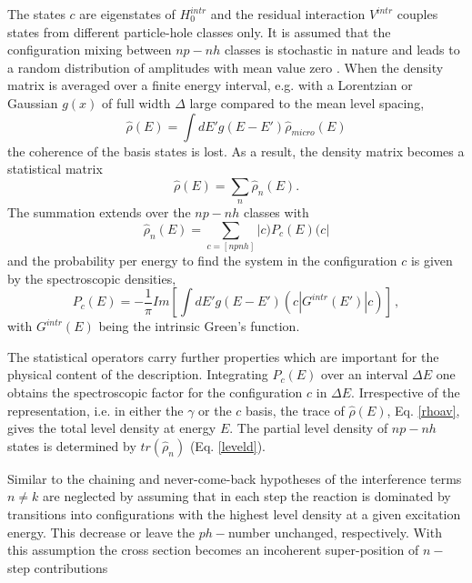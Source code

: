 \documentclass[twocolumn,amsmath,amssymb,10pt,groupedaddress,a4paper]{revtex4}
\begin{document}
\noindent The states $c$ are eigenstates of $H_{0}^{intr}$ and the residual
interaction $V^{intr}$ couples states from different particle-hole
classes only. It is assumed that the configuration mixing between
$np-nh$ classes is stochastic in nature and leads to a random distribution
of amplitudes with mean value zero \cite{LW92}. When the density
matrix is averaged over a finite energy interval, e.g. with a Lorentzian
or Gaussian $g(x)$ of full width $\Delta$ large compared to the
mean level spacing,
\begin{equation}
\hat{\rho}(E)=\int dE'g(E-E')\hat{\rho}_{micro}(E)\label{rhoav}
\end{equation}
\noindent the coherence of the basis states is lost. As a result, the density
matrix becomes a statistical matrix
\begin{equation}
\hat{\rho}(E)=\sum_{n}{\hat{\rho}_{n}(E)}.\label{levelc}
\end{equation}
\noindent The summation extends over the $np-nh$ classes with
\begin{equation}
\hat{\rho}_{n}(E)=\sum_{c=[npnh]}{|c)P_{c}(E)(c|}\label{leveld}
\end{equation}
\noindent and the probability per energy to find the system in the configuration
$c$ is given by the spectroscopic densities,
\begin{equation}
P_{c}(E)=-\frac{1}{\pi}Im[\int dE'g(E-E')(c|G^{intr}(E')|c)]\,,\label{specd}
\end{equation}
\noindent with $G^{intr}(E)$ being the intrinsic Green's function.

The statistical operators carry further properties which are important
for the physical content of the description. Integrating $P_{c}(E)$
over an interval $\Delta E$ one obtains the spectroscopic factor
for the configuration $c$ in $\Delta E$. Irrespective of the representation,
i.e. in either the $\gamma$ or the $c$ basis, the trace of $\hat{\rho}(E)$,
Eq. \ref{rhoav}, gives the total level density
at energy $E$. The partial level density of $np-nh$ states is determined
by $tr(\hat{\rho}_{n})$ (Eq. \ref{leveld}).

Similar to the chaining and never-come-back hypotheses of \cite{FKK}
the interference terms $n\ne k$ are neglected by assuming that in
each step the reaction is dominated by transitions into configurations
with the highest level density at a given excitation energy. This
decrease or leave the $ph-$number unchanged, respectively. With this
assumption the cross section becomes an incoherent super-position
of $n-$step contributions
\end{document}
